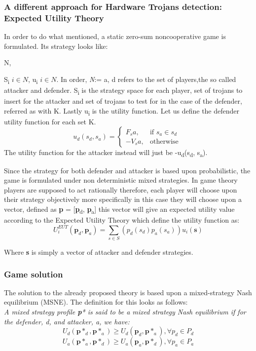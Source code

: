 \documentclass[conference]{IEEEtran}
\begin{document}
\subsubsection{A different approach for Hardware Trojans detection: Expected Utility Theory}
In order to do what mentioned, a static zero-sum noncooperative game is formulated. Its strategy looks like: {N, {S\textsubscript{i} $i\in N$, {u\textsubscript{i} $i\in N$}. In order, \textit{N}:= {a, d} refers to the set of players,the so called attacker and defender. S\textsubscript{i} is the strategy space for each player, set of trojans to insert for the attacker and set of trojans to test for in the case of the defender, referred as with K. Lastly u\textsubscript{i} is the utility function.
Let us define the defender utility function for each set K.
\begin{displaymath}
u_d(s_d, s_a) = \begin{cases} F_sa, & \mbox{if } s_a\in s_d \\ -V_sa, & \mbox{otherwise } \end{cases}
\end{displaymath}
The utility function for the attacker instead will just be -u\textsubscript{d}(s\textsubscript{d}, s\textsubscript{a}).

Since the strategy for both defender and attacker is based upon probabilistic, the game is formulated under non deterministic mixed strategies.
In game theory players are supposed to act rationally therefore, each player will choose upon their strategy objectively more specifically in this case they will choose upon a vector, defined as \textbf{p} = [\textbf{p}\textsubscript{d}, \textbf{p}\textsubscript{a}] this vector will give an expected utility value according to the Expected Utility Theory which define the utility function as: 
\begin{displaymath}
U_i^{EUT}(\textbf{p}_d, \textbf{p}_a) = \sum_{s\in S} (p_d(s_d)p_a(s_a)) u_i(\textbf{s})
\end{displaymath}

Where \textbf{s} is simply a vector of attacker and defender strategies.

\subsubsection{Game solution}
The solution to the already proposed theory is based upon a mixed-strategy Nash equilibrium (MSNE). The definition for this looks as follows:\\
\textit{A mixed strategy profile \textbf{p}* is said to be a mixed
strategy Nash equilibrium if for the defender, d, and attacker, a,
we have:}
\begin{displaymath}
U_d(\textbf{p}*_d,\textbf{p}*_a) \geq U_d(\textbf{p}_d,\textbf{p}*_a), \forall p_d\in P_d 
\end{displaymath}
\begin{displaymath}
U_a(\textbf{p}*_a,\textbf{p}*_d) \geq U_a(\textbf{p}_a,\textbf{p}*_d), \forall p_a\in P_a
\end{displaymath}

}}
\end{document}
